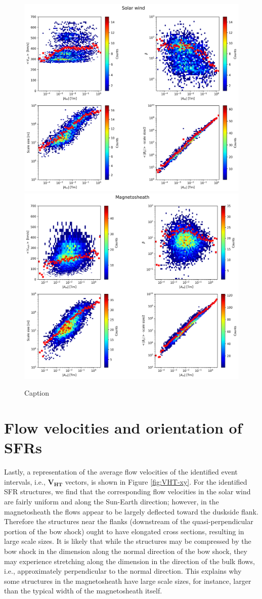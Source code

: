 \begin{figure}
    \centering
    \includegraphics[width=0.45\linewidth]{Figures/GS analysis/heatmap_solarwind.png}
    \includegraphics[width=0.45\linewidth]{Figures/GS analysis/heatmap_magnetosheath.png}
    \caption[2D distributions of various parameters vs. $|A_m|$]{Caption}
    \label{fig:heatmap-A}
\end{figure}

\section{Flow velocities and orientation of SFRs}
Lastly, a representation of the average flow velocities of the identified event intervals, i.e., $\mathbf{V_{HT}}$ vectors, is shown in Figure \ref{fig:VHT-xy}. For the identified SFR structures, we find that the corresponding flow velocities in the solar wind are fairly uniform and along the Sun-Earth direction; however, in the magnetosheath the flows appear to be largely deflected toward the duskside flank. Therefore the structures near the flanks (downstream of the quasi-perpendicular portion of the bow shock) ought to have elongated cross sections, resulting in large scale sizes. It is likely that while the structures may be compressed by the bow shock in the dimension along the normal direction of the bow shock, they may experience stretching along the dimension in the direction of the bulk flows, i.e., approximately perpendicular to the normal direction. This explains why some structures in the magnetosheath have large scale sizes, for instance, larger than the typical width of the magnetosheath itself.

